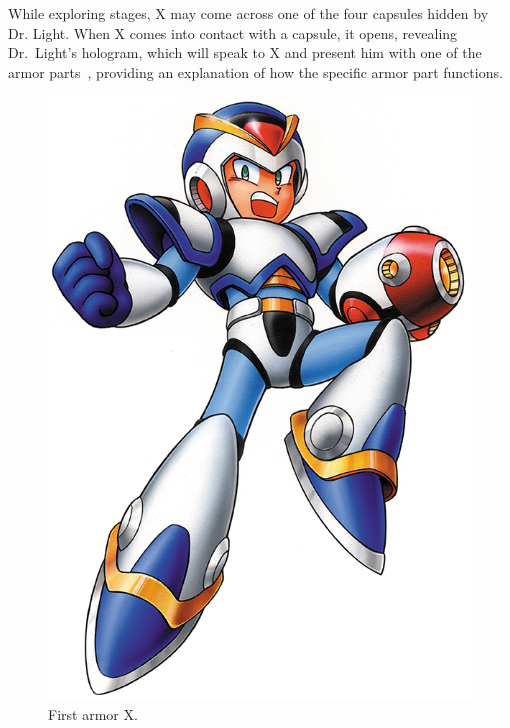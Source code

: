 While exploring stages, X may come across one of the four capsules hidden by Dr. Light. When X comes into contact with a capsule, it opens, revealing Dr.~Light's hologram, which will speak to X and present him with one of the armor parts~\cite{wiki:First_armor}, providing an explanation of how the specific armor part functions. 
\begin{figure}[htp]
	\centering
	\includegraphics[height=\portraitsize]{figures/X1/First_armor.png}
	\caption{First armor X.}
\end{figure}

